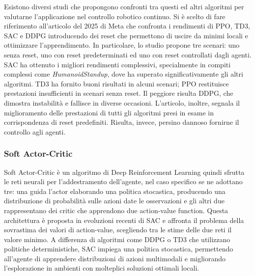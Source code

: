 Esistono diversi studi che propongono confronti tra questi ed altri algoritmi per valutarne l'applicazione nel controllo robotico continuo. Si è scelto di fare riferimento all'articolo del 2025 di Meta \cite{wan2025empirical} che confronta i rendimenti di PPO, TD3, SAC e DDPG introducendo dei reset che permettono di uscire da minimi locali e ottimizzare l'apprendimento. In particolare, lo studio propone tre scenari: uno senza reset, uno con reset predeterminati ed uno con reset controllati dagli agenti. SAC ha ottenuto i migliori rendimenti complessivi, specialmente in compiti complessi come \textit{HumanoidStandup}, dove ha superato significativamente gli altri algoritmi. TD3 ha fornito buoni risultati in alcuni scenari; PPO restituisce prestazioni insufficienti in scenari senza reset. Il peggiore risulta DDPG, che dimostra instabilità e fallisce in diverse occasioni. L'articolo, inoltre, segnala il miglioramento delle prestazioni di tutti gli algoritmi presi in esame in corrispondenza di reset predefiniti. Risulta, invece, persino dannoso fornirne il controllo agli agenti.


\subsubsection{Soft Actor-Critic}
Soft Actor-Critic è un algoritmo di Deep Reinforcement Learning quindi sfrutta le reti neurali per l'addestramento dell'agente, nel caso specifico se ne adottano tre: una guida l'actor elaborando una politica stocastica, producendo una distribuzione di probabilità sulle azioni date le osservazioni e gli altri due rappresentano dei critic che apprendono due action-value function. Questa architettura è proposta in evoluzioni recenti di SAC e affronta il problema della sovrastima dei valori di action-value, scegliendo tra le stime delle due reti il valore minimo. A differenza di algoritmi come DDPG o TD3 che utilizzano politiche deterministiche, SAC impiega una politica stocastica, permettendo all'agente di apprendere distribuzioni di azioni multimodali e migliorando l'esplorazione in ambienti con molteplici soluzioni ottimali locali. 

